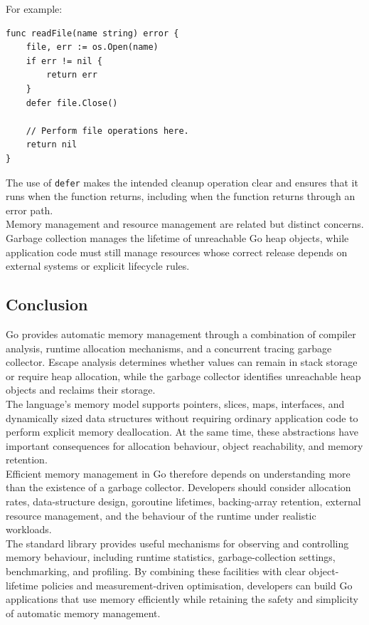 For example:

\begin{lstlisting}
func readFile(name string) error {
    file, err := os.Open(name)
    if err != nil {
        return err
    }
    defer file.Close()

    // Perform file operations here.
    return nil
}
\end{lstlisting}

The use of \texttt{defer} makes the intended cleanup operation clear and ensures that it runs when the function returns, including when the function returns through an error path.\\

Memory management and resource management are related but distinct concerns. Garbage collection manages the lifetime of unreachable Go heap objects, while application code must still manage resources whose correct release depends on external systems or explicit lifecycle rules.

\subsection{Conclusion}

Go provides automatic memory management through a combination of compiler analysis, runtime allocation mechanisms, and a concurrent tracing garbage collector. Escape analysis determines whether values can remain in stack storage or require heap allocation, while the garbage collector identifies unreachable heap objects and reclaims their storage.\\

The language's memory model supports pointers, slices, maps, interfaces, and dynamically sized data structures without requiring ordinary application code to perform explicit memory deallocation. At the same time, these abstractions have important consequences for allocation behaviour, object reachability, and memory retention.\\

Efficient memory management in Go therefore depends on understanding more than the existence of a garbage collector. Developers should consider allocation rates, data-structure design, goroutine lifetimes, backing-array retention, external resource management, and the behaviour of the runtime under realistic workloads.\\

The standard library provides useful mechanisms for observing and controlling memory behaviour, including runtime statistics, garbage-collection settings, benchmarking, and profiling. By combining these facilities with clear object-lifetime policies and measurement-driven optimisation, developers can build Go applications that use memory efficiently while retaining the safety and simplicity of automatic memory management.\\